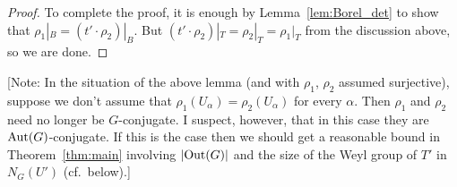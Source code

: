 \documentclass[12pt]{amsart}
\numberwithin{equation}{section}
\newtheorem{lem}[equation]{Lemma}
\theoremstyle{definition}
\theoremstyle{remark}
\newtheorem{rem}[equation]{Remark}
\theoremstyle{remark}
\begin{document}
\begin{proof}
 To complete the proof, it is enough by Lemma~\ref{lem:Borel_det} to show that $\rho_1|_B= (t'\cdot \rho_2)|_B$.  But $(t'\cdot \rho_2)|_T= \rho_2|_T= \rho_1|_T$ from the discussion above, so we are done.
%
% 
%
\end{proof}

[Note: In the situation of the above lemma (and with $\rho_1$, $\rho_2$ assumed surjective), suppose we don't assume that $\rho_1(U_\alpha)= \rho_2(U_\alpha)$ for every $\alpha$.  Then $\rho_1$ and $\rho_2$ need no longer be $G$-conjugate.  I suspect, however, that in this case they are ${\rm Aut}(G)$-conjugate.  If this is the case then we should get a reasonable bound in Theorem~\ref{thm:main} involving $|{\rm Out}(G)|$ and the size of the Weyl group of $T'$ in $N_G(U')$ (cf.\ below).] 
%


%
% 
\end{document}
